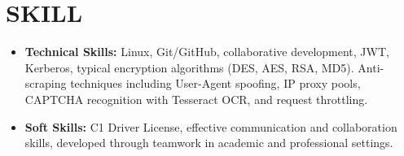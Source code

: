 \documentclass[a4paper,10.5pt]{article}
\newenvironment{resumeList}{\begin{itemize}[leftmargin=*, label=\textbullet{}, itemsep=2pt]}{\end{itemize}}
\newcommand{\resumeItem}[1]{\item\small{#1}}
\begin{document}
\section{SKILL}
\begin{resumeList}
    \resumeItem{\textbf{Technical Skills:} Linux, Git/GitHub, collaborative development, JWT, Kerberos, typical encryption algorithms (DES, AES, RSA, MD5). Anti-scraping techniques including User-Agent spoofing, IP proxy pools, CAPTCHA recognition with Tesseract OCR, and request throttling.}
    \resumeItem{\textbf{Soft Skills:} C1 Driver License, effective communication and collaboration skills, developed through teamwork in academic and professional settings.}
\end{resumeList}
\end{document}
